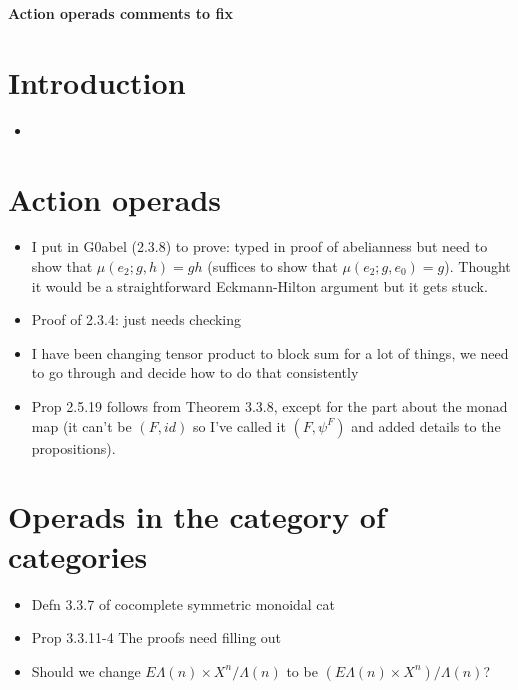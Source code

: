 \documentclass{amsart}
\begin{document}
\begin{center}
\begin{Large}
\textbf{Action operads comments to fix}
\end{Large}
\end{center}
\vskip1cm

\section{ Introduction}
\begin{itemize}
\item

\end{itemize}
\section{ Action operads}
\begin{itemize}
\item I put in G0abel (2.3.8) to prove: typed in proof of abelianness but need to show that $\mu(e_2;g,h) = gh$ (suffices to show that $\mu(e_2;g, e_0) = g$). Thought it would be a straightforward Eckmann-Hilton argument but it gets stuck.
\item Proof of 2.3.4: just needs checking
\item I have been changing tensor product to block sum for a lot of things, we need to go through and decide how to do that consistently
\item Prop 2.5.19 follows from Theorem 3.3.8, except for the part about the monad map (it can't be $(F,id)$ so I've called it $(F,\psi^F)$ and added details to the propositions).
\end{itemize}

\section{Operads in the category of categories}
\begin{itemize}
\item Defn 3.3.7 of cocomplete symmetric monoidal cat
\item Prop 3.3.11-4 The proofs need filling out
\item Should we change $E\Lambda(n) \times X^n/\Lambda(n)$ to be $\left(E\Lambda(n) \times X^n\right)/\Lambda(n)$?
\end{itemize}
\end{document}
